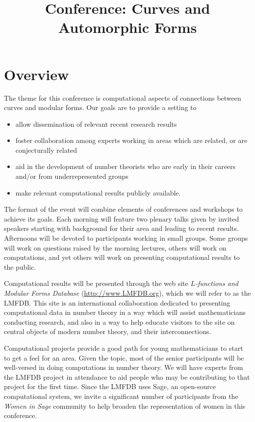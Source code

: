 \documentclass[amstex,11pt]{amsart}
\title{Conference: Curves and Automorphic Forms}
\numberwithin{equation}{section}
\begin{document}
%


\section{Overview}

The theme for this conference is computational aspects of connections
between curves and modular forms.  Our goals are to provide a setting
to
\begin{itemize}
\item allow dissemination of relevant recent research results
\item foster collaboration among experts working in areas which are
  related, or are conjecturally related
\item aid in the development of number theorists who are early in
  their careers and/or from underrepresented groups
\item make relevant computational results publicly available.
\end{itemize}

The format of the event will combine elements of conferences and
workshops to achieve its goals.  Each morning will feature two plenary
talks given by invited speakers starting with background for their
area and leading to recent results.  Afternoons will be devoted to
participants working in small groups.  Some groups will work on
questions raised by the morning lectures, others will work on
computations, and yet others will work on presenting computational
results to the public.

Computational results will be presented through the web site {\em
  $L$-functions and Modular Forms Database}
(\url{http://www.LMFDB.org}), which we will refer to as the LMFDB.
This site is an international collaboration dedicated to presenting
computational data in number theory in a way which will assist
mathematicians conducting research, and also in a way to help educate
visitors to the site on central objects of modern number theory, and their
interconnections.

Computational projects provide a good path for young mathematicians to
start to get a feel for an area.  Given the topic, most of the senior
participants will be well-versed in doing computations in number
theory.  We will have experts from the LMFDB project in attendance to
aid people who may be contributing to that project for the first
time.  Since the LMFDB uses Sage, an open-source computational system,
we invite a significant number of participants from the {\em Women in
  Sage} community to help broaden the representation of women in this
conference.
\end{document}
